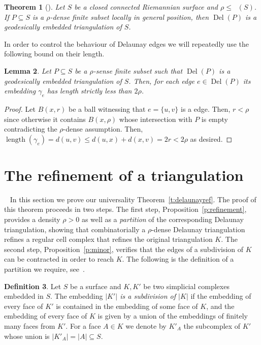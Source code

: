 \documentclass[reqno,english]{amsart}
\newtheorem{theorem}{Theorem}
\newtheorem{lemma}[theorem]{Lemma}
\numberwithin{claimcounter}{theorem}
\theoremstyle{remark}
\theoremstyle{definition}
\newtheorem{definition}[theorem]{Definition}
\numberwithin{theorem}{section}
\DeclareMathOperator{\rdel}{r_{Del}}
\DeclareMathOperator{\Del}{Del}
\DeclareMathOperator{\length}{length}
\begin{document}
\begin{theorem}[\cite{leibon99-delaunay}]
  \label{t:deltriang}
  Let $S$ be a closed connected Riemannian surface and $\rho \leq \rdel(S)$.
  If $P\subseteq S$ is a $\rho$-dense finite subset locally in general position,
  then $\Del(P)$ is a geodesically embedded triangulation of $S$. 
\end{theorem}

In order to control the behaviour of Delaunay edges we will repeatedly use the following bound on their length.

\begin{lemma}
  Let $P\subseteq S$ be a $\rho$-sense finite subset such that $\Del(P)$ is a geodesically embedded triangulation of $S$.
  Then, for each edge $e\in \Del(P)$ its embedding $\gamma_e$ has length strictly less than $2\rho$.
\end{lemma}
\begin{proof}
  Let $B(x,r)$ be a ball witnessing that $e=\{u,v\}$ is a edge.
  Then, $r< \rho$ since otherwise it contains $B(x,\rho)$ whose intersection with $P$ is empty contradicting the $\rho$-dense assumption.
  Then, $\length(\gamma_e)=d(u,v)\leq d(u,x)+d(x,v) = 2r < 2\rho$ as desired.
\end{proof}




\section{The refinement of a triangulation}
~\label{sec:Universality}
In this section we prove our universality Theorem~\ref{t:delaunayref}.
The proof of this theorem proceeds in two steps.
The first step, Proposition~\ref{p:refinement}, provides a density $\rho>0$ as well as a \emph{partition} of the corresponding Delaunay triangulation,  
showing that combinatorially a $\rho$-dense Delaunay triangulation refines a regular cell complex that refines the original triangulation $K$. 
The second step, Proposition~\ref{p:minor}, verifies that the edges of a subdivision of $K$ can be contracted in order to reach $K$.
The following is the definition of a partition we require, see~\cite[Sect. 15]{munkres84-elements}.

\begin{definition}
    Let $S$ be a surface and $K,K'$ be two simplicial complexes embedded in $S$. The embedding \emph{$|K'|$ is a subdivision of $|K|$} if the embedding of every face of $K'$ is contained in the embedding of some face of $K$, and the embedding of every face of $K$ is given by a union of the embeddings of finitely many faces from $K'$.
    For a face $A\in K$ we denote by $K'_A$ the subcomplex of $K'$ whose union is $|K'_A| = |A|\subseteq S$.
\end{definition}
\end{document}
